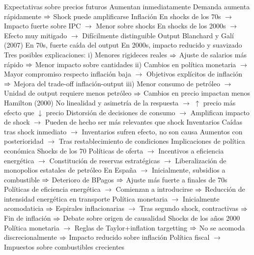 \documentclass{nuevotema}
\begin{document}
\begin{esquemal}
				\4 Expectativas sobre precios futuros
				\4[] Aumentan inmediatamente
				\4[] Demanda aumenta rápidamente
				\4[] $\Rightarrow$ Shock puede amplificarse
				\4 Inflación
				\4[] En shocks de los 70s
				\4[] $\to$ Impacto fuerte sobre IPC
				\4[] $\to$ Menor sobre shocks
				\4[] En shocks de los 2000s
				\4[] $\to$ Efecto muy mitigado
				\4[] $\to$ Difícilmente distinguible
				\4 Output
				\4[] Blanchard y Galí (2007)
				\4[] En 70s, fuerte caída del output
				\4[] En 2000s, impacto reducido y suavizado
				\4[] Tres posibles explicaciones:
				\4[] i) Menores rigideces reales
				\4[] $\Rightarrow$ Ajuste de salarios más rápido
				\4[] $\Rightarrow$ Menor impacto sobre cantidades
				\4[] ii) Cambios en política monetaria
				\4[] $\to$ Mayor compromiso respecto inflación baja
				\4[] $\to$ Objetivos explícitos de inflación
				\4[] $\Rightarrow$ Mejora del trade-off inflación-output
				\4[] iii) Menor consumo de petróleo
				\4[] $\to$ Unidad de output requiere menos petróleo
				\4[] $\Rightarrow$ Cambios en precio impactan menos
				\4[] Hamilton (2000)
				\4[] No linealidad y asimetría de la respuesta
				\4[] $\to$ $\uparrow$ precio más efecto que $\downarrow$ precio
				\4[] Distorsión de decisiones de consumo
				\4[] $\to$ Amplifican impacto de shock
				\4[] $\to$ Pueden de hecho ser más relevantes que shock
				\4 Inventarios
				\4[] Caídas tras shock inmediato
				\4[] $\to$ Inventarios sufren efecto, no son causa
				\4[] Aumentos con posterioridad
				\4[] $\to$ Tras restablecimiento de condiciones
			\3 Implicaciones de política económica
				\4 Shocks de los 70
				\4[] Políticas de oferta
				\4[] $\to$ Incentivos a eficiencia energética
				\4[] $\to$ Constitución de reservas estratégicas
				\4[] $\to$ Liberalización de monopolios estatales de petróleo
				\4[] En España
				\4[] $\to$ Inicialmente, subsidios a combustible
				\4[] $\Rightarrow$ Deterioro de BPagos
				\4[] $\Rightarrow$ Ajuste más fuerte a finales de 70s
				\4[] Políticas de eficiencia energética
				\4[] $\to$ Comienzan a introducirse
				\4[] $\Rightarrow$ Reducción de intensidad energética en transporte
				\4[] Política monetaria
				\4[] $\to$ Inicialmente acomodaticia
				\4[] $\Rightarrow$ Espirales inflacionarias
				\4[] $\to$ Tras segundo shock, contractivas
				\4[] $\Rightarrow$ Fin de inflación
				\4[] $\Rightarrow$ Debate sobre origen de causalidad
				\4 Shocks de los años 2000
				\4[] Política monetaria
				\4[] $\to$ Reglas de Taylor+inflation targetting
				\4[] $\Rightarrow$ No se acomoda discrecionalmente
				\4[] $\Rightarrow$ Impacto reducido sobre  inflación
				\4[] Política fiscal
				\4[] $\to$ Impuestos sobre combustibles crecientes

\end{esquemal}
\end{document}
